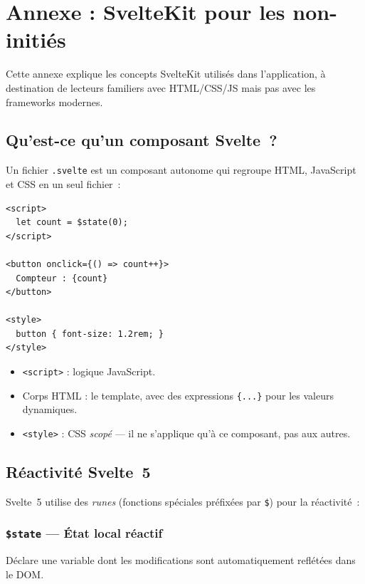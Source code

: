 \section{Annexe : SvelteKit pour les non-initiés}
\label{sec:sveltekit}

Cette annexe explique les concepts SvelteKit utilisés dans l'application, à destination de lecteurs familiers avec HTML/CSS/JS mais pas avec les frameworks modernes.

\subsection{Qu'est-ce qu'un composant Svelte~?}

Un fichier \texttt{.svelte} est un composant autonome qui regroupe HTML, JavaScript et CSS en un seul fichier~:

\begin{lstlisting}[language=svelte, title=Exemple : un composant minimal]
<script>
  let count = $state(0);
</script>

<button onclick={() => count++}>
  Compteur : {count}
</button>

<style>
  button { font-size: 1.2rem; }
</style>
\end{lstlisting}

\begin{itemize}
  \item \texttt{<script>} : logique JavaScript.
  \item Corps HTML : le template, avec des expressions \texttt{\{...\}} pour les valeurs dynamiques.
  \item \texttt{<style>} : CSS \emph{scopé} --- il ne s'applique qu'à ce composant, pas aux autres.
\end{itemize}

\subsection{Réactivité Svelte~5}

Svelte~5 utilise des \emph{runes} (fonctions spéciales préfixées par \texttt{\$}) pour la réactivité~:

\subsubsection{\texttt{\$state} --- État local réactif}

Déclare une variable dont les modifications sont automatiquement reflétées dans le DOM.


